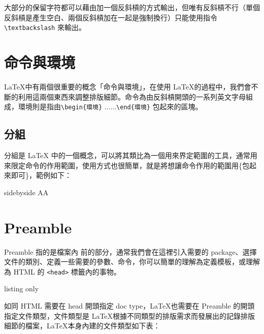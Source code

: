 大部分的保留字符都可以藉由加一個反斜槓的方式輸出，但唯有反斜槓不行（單個反斜槓是產生空白、兩個反斜槓加在一起是強制換行）只能使用指令 \verb|\textbackslash| 來輸出。

\section{命令與環境}

\LaTeX 中有兩個很重要的概念「命令與環境」，在使用 \LaTeX 的過程中，我們會不斷的利用這兩個東西來調整排版細節。命令為由反斜槓開頭的一系列英文字母組成，環境則是指由\verb|\begin{環境}| ......\verb|\end{環境}| 包起來的區塊。


\subsection{分組}

分組是 LaTeX 中的一個概念，可以將其類比為一個用來界定範圍的工具，通常用來限定命令的作用範圍，使用方式也很簡單，就是將想讓命令作用的範圍用\{包起來即可\}，範例如下：

\begin{tcblisting}{sidebyside}
{\large A}A
\end{tcblisting}

\section{Preamble}

Preamble 指的是檔案內 \verb|| 前的部分，通常我們會在這裡引入需要的 package、選擇文件的類別、定義一些需要的參數、命令，你可以簡單的理解為定義模板，或理解為 HTML 的 \verb|<head>| 標籤內的事物。

\begin{tcblisting}{listing only}


\end{tcblisting}

如同 HTML 需要在 head 開頭指定 doc type，\LaTeX 也需要在 Preamble 的開頭指定文件類型，文件類型是 \LaTeX 根據不同類型的排版需求而發展出的記錄排版細節的檔案，\LaTeX 本身內建的文件類型如下表：

